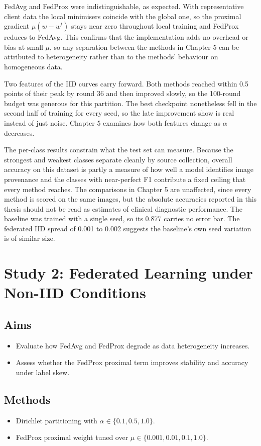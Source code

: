 \documentclass[12pt,openany,a4paper]{book}
\begin{document}
FedAvg and FedProx were indistinguishable, as expected. With representative client data the local minimisers coincide with the global one, so the proximal gradient $\mu(w - w^t)$ stays near zero throughout local training and FedProx reduces to FedAvg. This confirms that the implementation adds no overhead or bias at small $\mu$, so any separation between the methods in Chapter 5 can be attributed to heterogeneity rather than to the methods' behaviour on homogeneous data.

Two features of the IID curves carry forward. Both methods reached within 0.5 points of their peak by round 36 and then improved slowly, so the 100-round budget was generous for this partition. The best checkpoint nonetheless fell in the second half of training for every seed, so the late improvement show is real instead of just noise. Chapter 5 examines how both features change as $\alpha$ decreases.

The per-class results constrain what the test set can measure. Because the strongest and weakest classes separate cleanly by source collection, overall accuracy on this dataset is partly a measure of how well a model identifies image provenance and the classes with near-perfect F1 contribute a fixed ceiling that every method reaches. The comparisons in Chapter 5 are unaffected, since every method is scored on the same images, but the absolute accuracies reported in this thesis should not be read as estimates of clinical diagnostic performance. The baseline was trained with a single seed, so its 0.877 carries no error bar. The federated IID spread of 0.001 to 0.002 suggests the baseline's own seed variation is of similar size.

\chapter{Study 2: Federated Learning under Non-IID Conditions}

\section{Aims}
\begin{itemize}
  \item Evaluate how FedAvg and FedProx degrade as data heterogeneity increases.
  \item Assess whether the FedProx proximal term improves stability and accuracy under label skew.
\end{itemize}

\section{Methods}
\begin{itemize}
  \item Dirichlet partitioning with $\alpha \in \{0.1, 0.5, 1.0\}$.
  \item FedProx proximal weight tuned over $\mu \in \{0.001, 0.01, 0.1, 1.0\}$.
\end{itemize}
\end{document}
